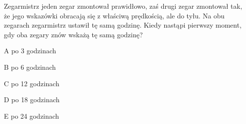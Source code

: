 \begin{tresc}
Zegarmistrz jeden zegar zmontował prawidłowo, zaś drugi zegar zmontował tak, że jego wskazówki obracają się z właściwą prędkością, ale do tyłu. Na obu zegarach zegarmistrz ustawił tę samą godzinę. Kiedy nastąpi pierwszy moment, gdy oba zegary znów wskażą tę samą godzinę?
\end{tresc}
\begin{wariant}{A} po 3 godzinach \end{wariant}
\begin{wariant}{B} po 6 godzinach \end{wariant}
\begin{wariant}{C} po 12 godzinach \end{wariant}
\begin{wariant}{D} po 18 godzinach \end{wariant}
\begin{wariant}{E} po 24 godzinach \end{wariant}
